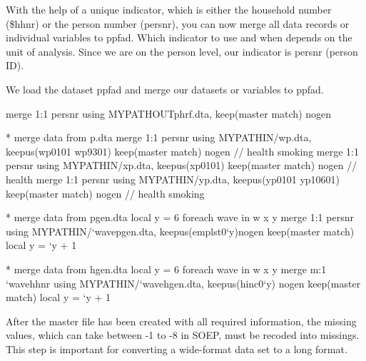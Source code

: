 \documentclass[letterpaper,10pt,openany,onesideH,english]{sphinxmanual}
\begin{document}
With the help of a unique indicator, which is either the household number (\$hhnr) or the person number (persnr), you can now merge all data records or individual variables to ppfad. Which indicator to use and when depends on the unit of analysis. Since we are on the person level, our indicator is persnr (person ID).

We load the dataset ppfad and merge our datasets or variables to ppfad.

%
\begin{sphinxVerbatim}[commandchars=\\\{\},numbers=left,firstnumber=1,stepnumber=1]

merge 1:1 persnr using \PYGZdq{}\PYGZdl{}\PYGZob{}MY\PYGZus{}PATH\PYGZus{}OUT\PYGZcb{}phrf.dta\PYGZdq{}, keep(master match) nogen


* merge data from \PYGZdl{}p.dta 
merge 1:1 persnr using \PYGZdq{}\PYGZdl{}\PYGZob{}MY\PYGZus{}PATH\PYGZus{}IN\PYGZcb{}/wp.dta\PYGZdq{}, keepus(wp0101 wp9301)  keep(master match) nogen // health \PYGZam{} smoking
merge 1:1 persnr using \PYGZdq{}\PYGZdl{}\PYGZob{}MY\PYGZus{}PATH\PYGZus{}IN\PYGZcb{}/xp.dta\PYGZdq{}, keepus(xp0101) 		  keep(master match) nogen // health
merge 1:1 persnr using \PYGZdq{}\PYGZdl{}\PYGZob{}MY\PYGZus{}PATH\PYGZus{}IN\PYGZcb{}/yp.dta\PYGZdq{}, keepus(yp0101 yp10601) keep(master match) nogen // health \PYGZam{} smoking

* merge data from \PYGZdl{}pgen.dta 
local y = 6
foreach wave in w x y \PYGZob{}
	merge 1:1 persnr using \PYGZdq{}\PYGZdl{}\PYGZob{}MY\PYGZus{}PATH\PYGZus{}IN\PYGZcb{}/{}`wave\PYGZsq{}pgen.dta\PYGZdq{}, keepus(emplst0{}`y\PYGZsq{})nogen keep(master match) 
	local y = {}`y\PYGZsq{} + 1
\PYGZcb{}

* merge data from \PYGZdl{}hgen.dta 
local y = 6
foreach wave in w x y \PYGZob{}
	merge m:1 {}`wave\PYGZsq{}hhnr using \PYGZdq{}\PYGZdl{}\PYGZob{}MY\PYGZus{}PATH\PYGZus{}IN\PYGZcb{}/{}`wave\PYGZsq{}hgen.dta\PYGZdq{}, keepus(hinc0{}`y\PYGZsq{}) nogen keep(master match) 
	local y = {}`y\PYGZsq{} + 1
\PYGZcb{}

\end{sphinxVerbatim}


After the master file has been created with all required information, the missing values, which can take between -1 to -8 in SOEP, must be recoded into missings. This step is important for converting a wide-format data set to a long format.
\end{document}

